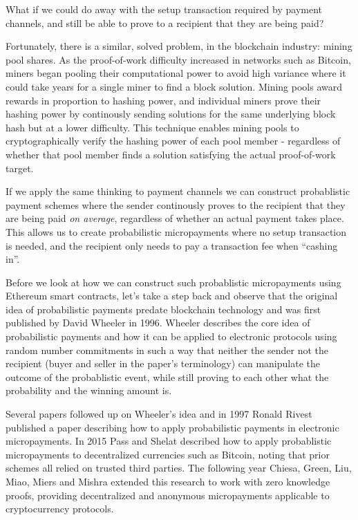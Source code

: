What if we could do away with the setup transaction required by payment channels, and still be able to prove to a recipient that they are being paid?

Fortunately, there is a similar, solved problem, in the blockchain industry: mining pool shares\cite{MiningPoolMethods}. As the proof-of-work difficulty increased in networks such as Bitcoin, miners began pooling their computational power to avoid high variance where it could take years for a single miner to find a block solution. Mining pools award rewards in proportion to hashing power, and individual miners prove their hashing power by continously sending solutions\cite{MiningPoolShares} for the same underlying block hash but at a lower difficulty. This technique enables mining pools to cryptographically verify the hashing power of each pool member - regardless of whether that pool member finds a solution satisfying the actual proof-of-work target.

If we apply the same thinking to payment channels we can construct probablistic payment schemes where the sender continously proves to the recipient that they are being paid \emph{on average}, regardless of whether an actual payment takes place. This allows us to create probabilistic micropayments where no setup transaction is needed, and the recipient only needs to pay a transaction fee when  ``cashing in''.

Before we look at how we can construct such probablistic micropayments using Ethereum smart contracts, let's take a step back and observe that the original idea of probabilistic payments predate blockchain technology and was first published by David Wheeler\cite{txnbets} in 1996. Wheeler describes the core idea of probabilistic payments and how it can be applied to electronic protocols using random number commitments in such a way that neither the sender not the recipient (buyer and seller in the paper's terminology) can manipulate the outcome of the probablistic event, while still proving to each other what the probability and the winning amount is.

Several papers followed up on Wheeler's idea and in 1997 Ronald Rivest\cite{lotterytickets} published a paper describing how to apply probabilistic payments in electronic micropayments. In 2015 Pass and Shelat\cite{Micropayments} described how to apply probablistic micropayments to decentralized currencies such as Bitcoin, noting that prior schemes all relied on trusted third parties. The following year Chiesa, Green, Liu, Miao, Miers and Mishra\cite{DAM} extended this research to work with zero knowledge proofs, providing decentralized and anonymous micropayments applicable to cryptocurrency protocols.

